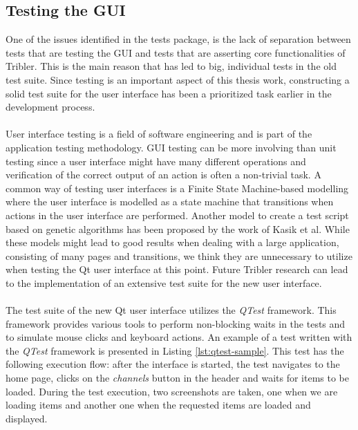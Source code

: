 \subsection{Testing the GUI}
One of the issues identified in the tests package, is the lack of separation between tests that are testing the GUI and tests that are asserting core functionalities of Tribler. This is the main reason that has led to big, individual tests in the old test suite. Since testing is an important aspect of this thesis work, constructing a solid test suite for the user interface has been a prioritized task earlier in the development process.\\\\
User interface testing is a field of software engineering and is part of the application testing methodology. GUI testing can be more involving than unit testing since a user interface might have many different operations and verification of the correct output of an action is often a non-trivial task. A common way of testing user interfaces is a Finite State Machine-based modelling where the user interface is modelled as a state machine that transitions when actions in the user interface are performed\cite{clarke1998automated}\cite{belli2001finite}. Another model to create a test script based on genetic algorithms has been proposed by the work of Kasik et al\cite{kasik1996toward}. While these models might lead to good results when dealing with a large application, consisting of many pages and transitions, we think they are unnecessary to utilize when testing the Qt user interface at this point. Future Tribler research can lead to the implementation of an extensive test suite for the new user interface.\\\\
The test suite of the new Qt user interface utilizes the \emph{QTest} framework. This framework provides various tools to perform non-blocking waits in the tests and to simulate mouse clicks and keyboard actions. An example of a test written with the \emph{QTest} framework is presented in Listing \ref{lst:qtest-sample}. This test has the following execution flow: after the interface is started, the test navigates to the home page, clicks on the \emph{channels} button in the header and waits for items to be loaded. During the test execution, two screenshots are taken, one when we are loading items and another one when the requested items are loaded and displayed.\\\\
